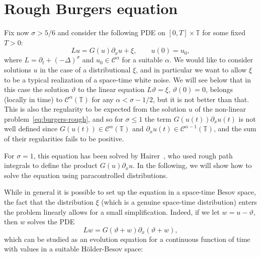 \documentclass[11pt,a4paper]{article}
\theoremstyle{remark}
\newcommand{\CC}{\ensuremath{\mathscr{C}}}
\begin{document}
\section{Rough Burgers equation}\label{sec:burgers}

Fix now $\sigma > 5/6$ and consider the following PDE on $[ 0,T ] \times \mathbb{T}$ for some fixed $T>0$:
\begin{equation}\label{eq:burgers-rough}
  L u=G ( u ) \partial_{x} u+ \xi, \qquad u(0) = u_0,
\end{equation}
where $L= \partial_{t} + ( - \Delta )^{\sigma}$ and $u_0 \in \CC^\alpha$ for a suitable $\alpha$. We would like to consider solutions $u$ in the case of a
distributional $\xi$, and in particular we want to allow $\xi$ to be a typical
realization of a space-time white noise. We will see below that in this case
the solution $\vartheta$ to the linear equation $L  \vartheta = \xi$,
$\vartheta ( 0 ) =0$, belongs (locally in time) to $\CC^{\alpha} ( \mathbb{T})$ for any $\alpha < \sigma -1/2$, but it is not better than that. This is
also the regularity to be expected from the solution $u$ of the non-linear
problem~{\eqref{eq:burgers-rough}}, and so for $\sigma \leqslant 1$ the term $G ( u ( t ) ) \partial_{x} u ( t )$ is not well defined since $G ( u ( t ) ) \in \CC^{\alpha} ( \mathbb{T} )$ and $\partial_{x} u ( t ) \in \CC^{\alpha -1} (\mathbb{T} )$, and the sum of their regularities fails to be positive.

For $\sigma =1$, this equation has been solved by
Hairer~{\cite{Hairer2011}}, who used rough path integrals to define the
product $G ( u ) \partial_{x} u$. In the following, we will show how to solve
the equation using paracontrolled distributions.



While in general it is possible to set up the equation in a space-time Besov
space, the fact that the distribution $\xi$ (which is a genuine space-time
distribution) enters the problem linearly allows for a small simplification.
Indeed, if we let $w=u- \vartheta$, then $w$ solves the PDE
\begin{equation}\label{eq:burgers-alt}
  L w=G ( \vartheta +w ) \partial_{x} ( \vartheta +w ),
\end{equation}
which can be studied as an evolution equation for a continuous function of
time with values in a suitable H{\"o}lder-Besov space:
\end{document}
